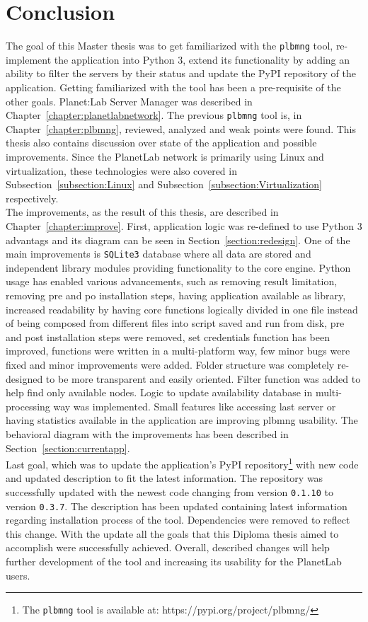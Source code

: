 \chapter{Conclusion}
The goal of this Master thesis was to get familiarized with the \texttt{plbmng} tool, re-implement the application into Python 3, extend its functionality by adding an ability to filter the servers by their status and update the PyPI repository of the application. Getting familiarized with the tool has been a pre-requisite of the other goals. Planet:Lab Server Manager was described in Chapter~\ref{chapter:planetlabnetwork}. The previous \texttt{plbmng} tool is, in Chapter~\ref{chapter:plbmng}, reviewed, analyzed and weak points were found. This thesis also contains discussion over state of the application and possible improvements. Since the PlanetLab network is primarily using Linux and virtualization, these technologies were also covered in Subsection~\ref{subsection:Linux} and Subsection~\ref{subsection:Virtualization} respectively.\\
The improvements, as the result of this thesis, are described in Chapter~\ref{chapter:improve}. First, application logic was re-defined to use Python 3 advantags and its diagram can be seen in Section~\ref{section:redesign}. One of the main improvements is \texttt{SQLite3} database where all data are stored and independent library modules providing functionality to the core engine. Python usage has enabled various advancements, such as removing result limitation, removing pre and po installation steps, having application available as library, increased readability by having core functions logically divided in one file instead of being composed from different files into script saved and run from disk, pre and post installation steps were removed, set credentials function has been improved, functions were written in a multi-platform way, few minor bugs were fixed and minor improvements were added. Folder structure was completely re-designed to be more transparent and easily oriented. Filter function was added to help find only available nodes. Logic to update availability database in multi-processing way was implemented. Small features like accessing last server or having statistics available in the application are improving plbmng usability. The behavioral diagram with the improvements has been described in Section~\ref{section:currentapp}.\\
Last goal, which was to update the application's PyPI repository\footnote{The \texttt{plbmng} tool is available at: https://pypi.org/project/plbmng/} with new code and updated description to fit the latest information. The repository was successfully updated with the newest code changing from version \texttt{0.1.10} to version \texttt{0.3.7}. The description has been updated containing latest information regarding installation process of the tool. Dependencies were removed to reflect this change. With the update all the goals that this Diploma thesis aimed to accomplish were successfully achieved. Overall, described changes will help further development of the tool and increasing its usability for the PlanetLab users.
